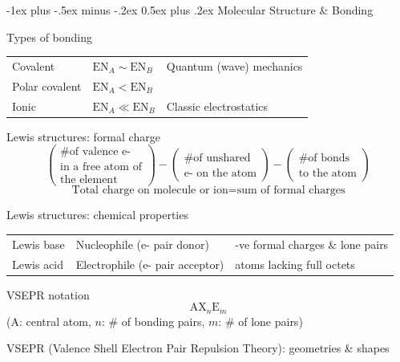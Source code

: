 \documentclass[10pt,landscape]{article}
\makeatletter
\renewcommand{\section}{\@startsection{section}{1}{0mm}%
                                {-1ex plus -.5ex minus -.2ex}%
                                {0.5ex plus .2ex}%
                                {\normalfont\large\bfseries}}
\newcommand{\extraline}{\vspace{1em}}
\newcommand{\tableindent}{\hspace{1.5em}}
\makeatother
\begin{document}
\begin{multicols}{3}
\hrulefill

\section{Molecular Structure \& Bonding}

Types of bonding 
%
\begin{center}
\vspace{-2em}
\begin{tabular}{@{}llp{26mm}<{\raggedright}@{}}
	Covalent & $\text{EN}_A \sim  \text{EN}_B$ & Quantum (wave) mechanics \\
	Polar covalent & $\text{EN}_A < \text{EN}_B$ & \\
	Ionic & $\text{EN}_A \ll  \text{EN}_B$ &  Classic electrostatics \\
\end{tabular}
\end{center}

Lewis structures: formal charge
\[
\begin{pmatrix}
	 \text{\# of valence e-} \\
	 \text{in a free atom of} \\
	  \text{the element}
\end{pmatrix}
-
\begin{pmatrix}
	\text{\# of unshared} \\
	\text{e- on the atom} 
\end{pmatrix}
-
\begin{pmatrix}
	\text{\# of bonds} \\
	\text{to the atom} 
\end{pmatrix}
\]
\[ \text{Total charge on molecule or ion} = \text{sum of formal charges} \]

\extraline

Lewis structures: chemical properties

\begin{tabular}{@{\tableindent}lp{2.45cm}<{\raggedright}p{2.6cm}<{\raggedright}@{}}
Lewis base & Nucleophile (e- pair donor) & -ve formal charges \& lone pairs \\
Lewis acid & Electrophile (e- pair acceptor) & atoms lacking full octets
\end{tabular}
\extraline

VSEPR notation
\[ \text{AX}_n\text{E}_m \]
\tableindent (A: central atom, $n$: \# of bonding pairs, $m$: \# of lone pairs) \\
\extraline


VSEPR (Valence Shell Electron Pair Repulsion Theory): geometries \& shapes


\end{multicols}
\end{document}
